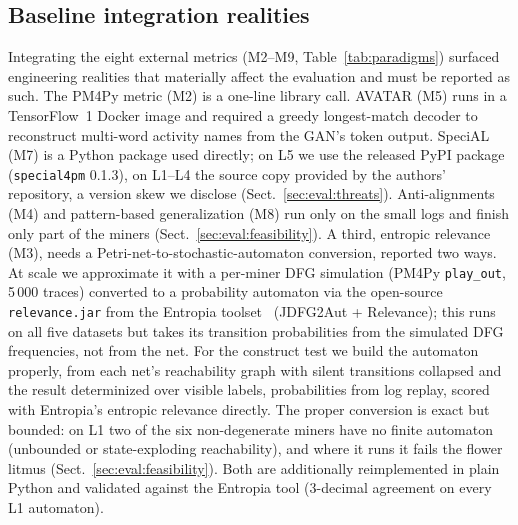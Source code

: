 \documentclass[runningheads]{llncs}
\newcommand{\chg}[1]{#1}
\begin{document}
\subsection{Baseline integration realities}
\label{sec:impl:baselines}
Integrating the eight external metrics (M2--M9, Table~\ref{tab:paradigms}) surfaced engineering realities that materially affect the evaluation and must be reported as such. The PM4Py metric (M2) is a one-line library call. AVATAR (M5) runs in a TensorFlow~1 Docker image and required a greedy longest-match decoder to reconstruct multi-word activity names from the GAN's token output. SpeciAL (M7) is a Python package used directly\chg{; on L5 we use the released PyPI package (\texttt{special4pm} 0.1.3), on L1--L4 the source copy provided by the authors' repository, a version skew we disclose (Sect.~\ref{sec:eval:threats})}. \chg{Anti-alignments (M4) and pattern-based generalization (M8) run only on the small logs and finish only part of the miners} (Sect.~\ref{sec:eval:feasibility}). A third, entropic relevance (M3), needs a Petri-net-to-stochastic-automaton conversion, reported two ways. \chg{At scale we approximate it with a per-miner DFG simulation (PM4Py \texttt{play\_out}, 5\,000 traces) converted to a probability automaton via the open-source \texttt{relevance.jar} from the Entropia toolset~\cite{polyvyanyy2020entropia} (JDFG2Aut + Relevance); this runs on all five datasets but takes its transition probabilities from the simulated DFG frequencies, not from the net. For the construct test we build the automaton properly, from each net's reachability graph with silent transitions collapsed and the result determinized over visible labels, probabilities from log replay, scored with Entropia's entropic relevance directly. The proper conversion is exact but bounded: on L1 two of the six non-degenerate miners have no finite automaton (unbounded or state-exploding reachability), and where it runs it fails the flower litmus (Sect.~\ref{sec:eval:feasibility}). Both are additionally reimplemented in plain Python and validated against the Entropia tool ($3$-decimal agreement on every L1 automaton).}
\end{document}
